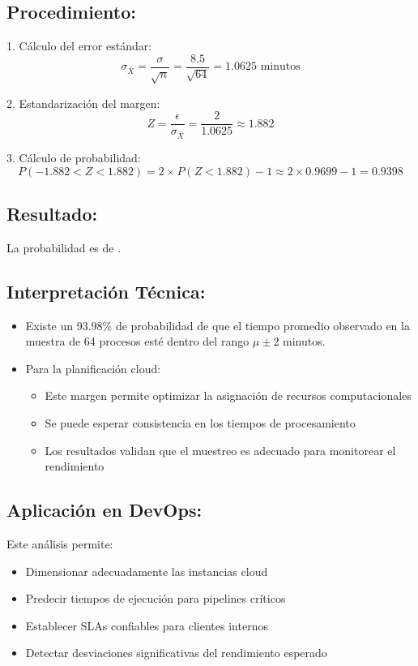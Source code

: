 \subsection*{Procedimiento:}

1. Cálculo del error estándar:
\[ \sigma_{\bar{X}} = \frac{\sigma}{\sqrt{n}} = \frac{8.5}{\sqrt{64}} = 1.0625 \text{ minutos} \]

2. Estandarización del margen:
\[ Z = \frac{\epsilon}{\sigma_{\bar{X}}} = \frac{2}{1.0625} \approx 1.882 \]

3. Cálculo de probabilidad:
\[ P(-1.882 < Z < 1.882) = 2 \times P(Z < 1.882) - 1 \approx 2 \times 0.9699 - 1 = 0.9398 \]

\subsection*{Resultado:}
La probabilidad es de .

\subsection*{Interpretación Técnica:}
\begin{itemize}
    \item Existe un 93.98\% de probabilidad de que el tiempo promedio observado en la muestra de 64 procesos esté dentro del rango $\mu \pm 2$ minutos.
    \item Para la planificación cloud:
    \begin{itemize}
        \item Este margen permite optimizar la asignación de recursos computacionales
        \item Se puede esperar consistencia en los tiempos de procesamiento
        \item Los resultados validan que el muestreo es adecuado para monitorear el rendimiento
    \end{itemize}
\end{itemize}

\subsection*{Aplicación en DevOps:}
Este análisis permite:
\begin{itemize}
    \item Dimensionar adecuadamente las instancias cloud
    \item Predecir tiempos de ejecución para pipelines críticos
    \item Establecer SLAs confiables para clientes internos
    \item Detectar desviaciones significativas del rendimiento esperado
\end{itemize}

